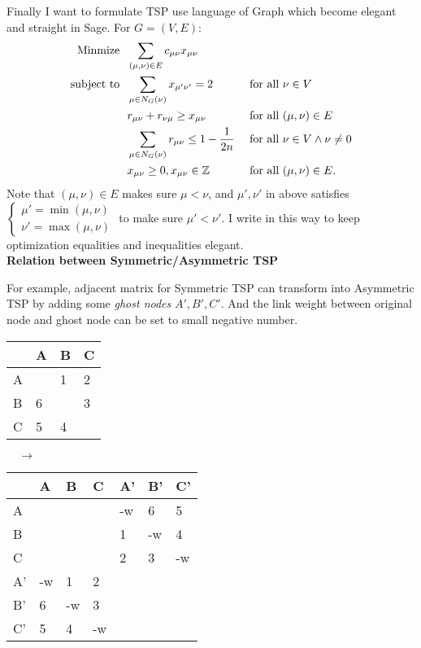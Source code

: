 \documentclass{mcmthesis}
\begin{document}
Finally I want to formulate TSP use language of Graph which become elegant and straight in Sage. For $G=(V,E)$:
\begin{align}
	\mathop{\mathrm{Minmize \ \  }}       & \sum_{(\mu,\nu)\in E} c_{\mu \nu}x_{\mu \nu}                &  & \notag                                                \\
	\mathop{\mathrm{subject \  to \ \  }} & \sum_{\mu \in N_G(\nu)} x_{\mu' \nu'}=2                     &  & \text{ for all } \nu \in V   \notag                   \\
	                                      & r_{\mu \nu} + r_{\nu \mu} \ge x_{\mu \nu}                   &  & \text{ for all } (\mu, \nu) \in E \notag              \\
	                                      & \sum_{ \mu \in  N_G(\nu)} r_{\mu \nu}\le 1-\dfrac{1}{2n} &  & \text{ for all } \nu \in V \wedge \nu \ne 0    \notag \\
	                                      & x_{\mu \nu} \geq 0, x_{\mu \nu} \in \mathbb{Z}                    &  & \text{ for all } (\mu, \nu) \in E. \notag
\end{align}
Note that $ (\mu, \nu) \in E$ makes sure $\mu <\nu$, and $\mu',\nu'$ in above satisfies  $\begin{cases}
\mu'=\min(\mu,\nu) \\
\nu'=\max(\mu,\nu)
\end{cases}$ to make sure  $\mu' <\nu'$. I write in this way to keep optimization equalities and inequalities elegant. \vspace{1em}
\\{\textbf{\large Relation between Symmetric/Asymmetric TSP}} \label{relation}

For example\cite{bib:wiki/tsp}, adjacent matrix for Symmetric TSP can transform into Asymmetric TSP by adding some\textit{ ghost nodes}  $A', B', C'$. And the link weight between original node and ghost node can be set to  small negative number.   %
\begin{center}
\begin{tabular}{|l||l|l|l|}
	\hline
	& A & B & C \\ \hline \hline
	A &   & 1 & 2 \\ \hline
	B & 6 &   & 3 \\ \hline
	C & 5 & 4 &   \\ \hline
\end{tabular} $\quad \rightarrow \quad $
\begin{tabular}{|l||l|l|l|l|l|l|}
	\hline
	&A  & B  & C  & A' & B' & C'     \\ \hline \hline
	A  &    &    &    & -w & 6  & 5  \\ \hline
	B  &    &    &    & 1  & -w & 4  \\ \hline
	C  &    &    &    & 2  & 3  & -w \\ \hline
	A' & -w & 1  & 2  &    &    &    \\ \hline
	B' & 6  & -w & 3  &    &    &    \\ \hline
	C' & 5  & 4  & -w &    &    &    \\ \hline
\end{tabular}
\end{center}
\end{document}
